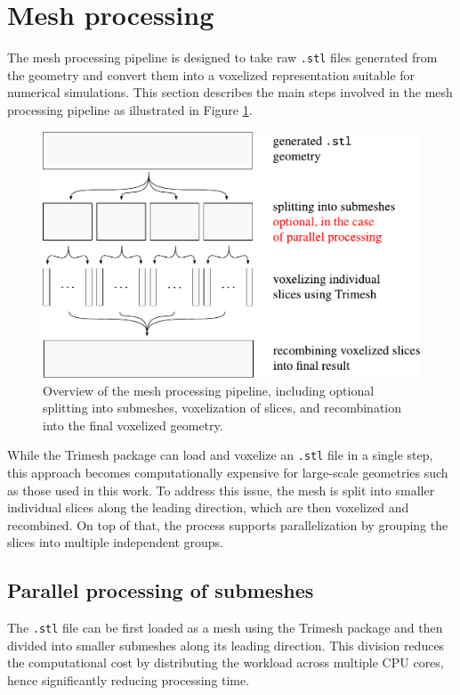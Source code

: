 \section{Mesh processing}\label{mesh}

The mesh processing pipeline is designed to take raw \texttt{.stl} files generated from the geometry and convert them into a voxelized representation suitable for numerical simulations. This section describes the main steps involved in the mesh processing pipeline as illustrated in Figure \ref{fig:voxelizing}.

\begin{figure}[H]
	\centering
	\vspace{2mm}
	\includegraphics[width=.66\textwidth]{figures/voxelizing.pdf}
	\vspace{2mm}
	\caption{Overview of the mesh processing pipeline, including optional splitting into submeshes, voxelization of slices, and recombination into the final voxelized geometry.}
	\label{fig:voxelizing}
\end{figure}

While the Trimesh package can load and voxelize an \texttt{.stl} file in a single step, this approach becomes computationally expensive for large-scale geometries such as those used in this work. To address this issue, the mesh is split into smaller individual slices along the leading direction, which are then voxelized and recombined. On top of that, the process supports parallelization by grouping the slices into multiple independent groups.

\subsection{Parallel processing of submeshes}\label{parallelization}
 The \texttt{.stl} file can be first loaded as a mesh using the Trimesh package and then divided into smaller submeshes along its leading direction. This division reduces the computational cost by distributing the workload across multiple CPU cores, hence significantly reducing processing time.

